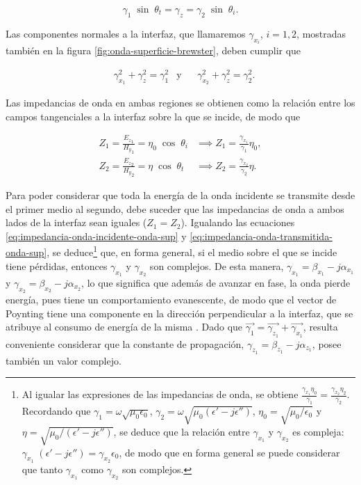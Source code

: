 \begin{equation}
	\gamma_{1} \; \sin \; \theta_t = \gamma_{z} = \gamma_2 \; \sin \; \theta_i.
\end{equation}

Las componentes normales a la interfaz, que llamaremos $\gamma_{x_i}$, $i=1,2$, mostradas también en la figura \ref{fig:onda-superficie-brewster}, deben cumplir que

\begin{align}
	\label{eq:condicion-componentes-normales-ondas-superficie}
	& \gamma_{x_1}^2 + \gamma_z^2 = \gamma_1^2 &\text{y} &&\gamma_{x_2}^2 + \gamma_z^2 = \gamma_2^2.
\end{align}

Las impedancias de onda en ambas regiones se obtienen como la relación entre los campos tangenciales a la interfaz sobre la que se incide, de modo que

\begin{subequations}
\label{eq:impedancia-onda-superficie}
\begin{align}
	Z_1 = \frac{{E_z}_1}{{H_y}_1} = \eta_0 \; \cos\; \theta_i &\implies Z_1 = \frac{\gamma_{x_1}}{\gamma_1} \eta_0, \label{eq:impedancia-onda-incidente-onda-sup}\\
	Z_2 = \frac{{E_z}_2}{{H_y}_2} = \eta \; \cos \; \theta_t &\implies Z_2 = \frac{\gamma_{x_2}}{\gamma_2} \eta. \label{eq:impedancia-onda-transmitida-onda-sup}
\end{align}
\end{subequations}

Para poder considerar que toda la energía de la onda incidente se transmite desde el primer medio al segundo, debe suceder que las impedancias de onda a ambos lados de la interfaz sean iguales ($Z_1 = Z_2$). Igualando las ecuaciones \ref{eq:impedancia-onda-incidente-onda-sup} y \ref{eq:impedancia-onda-transmitida-onda-sup}, se deduce\footnote{Al igualar las expresiones de las impedancias de onda, se obtiene $\frac{\gamma_{x_1} \eta_0}{\gamma_1} = \frac{\gamma_{x_2} \eta_2}{\gamma_2}$. Recordando que $\gamma_1=\omega \sqrt{\mu_0 \epsilon_0}$, $\gamma_2=\omega \sqrt{\mu_0 (\epsilon'-j\epsilon'')}$, $\eta_0 = \sqrt{\mu_0 / \epsilon_0}$ y $\eta = \sqrt{\mu_0 / (\epsilon'-j\epsilon'')}$, se deduce que la relación entre $\gamma_{x_1}$ y $\gamma_{x_2}$ es compleja: $\gamma_{x_1}\; (\epsilon' - j \epsilon'') = \gamma_{x_2} \epsilon_0$, de modo que en forma general se puede considerar que tanto $\gamma_{x_1}$ como $\gamma_{x_2}$ son complejos.} que, en forma general, si el medio sobre el que se incide tiene pérdidas, entonces $\gamma_{x_1}$ y $\gamma_{x_2}$ son complejos. De esta manera, $\gamma_{x_1} = \beta_{x_1} - j\alpha_{x_1}$ y $\gamma_{x_2} = \beta_{x_2} - j\alpha_{x_2}$, lo que significa que además de avanzar en fase, la onda pierde energía, pues tiene un comportamiento evanescente, de modo que el vector de Poynting tiene una componente en la dirección perpendicular a la interfaz, que se atribuye al consumo de energía de la misma \cite{Barlow:SurfaceWaves}. Dado que $\vec{\gamma_1} = \vec{\gamma_{z_1}} + \vec{\gamma_{x_1}}$, resulta conveniente considerar que la constante de propagación, $\gamma_{z_1} = \beta_{z_1} - j \alpha_{z_1}$, posee también un valor complejo.

